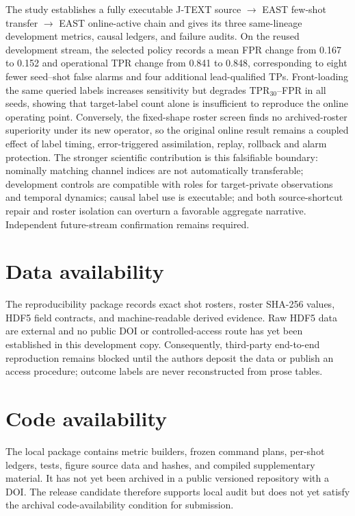 \documentclass[10pt,twocolumn]{article}
\newcommand{\jtext}{J-TEXT}
\newcommand{\east}{EAST}
\begin{document}
The study establishes a fully executable \jtext{} source $\rightarrow$ \east{} few-shot transfer $\rightarrow$ \east{} online-active chain and gives its three same-lineage development metrics, causal ledgers, and failure audits.  On the reused development stream, the selected policy records a mean FPR change from 0.167 to 0.152 and operational TPR change from 0.841 to 0.848, corresponding to eight fewer seed--shot false alarms and four additional lead-qualified TPs.  Front-loading the same queried labels increases sensitivity but degrades TPR$_{30}$--FPR in all seeds, showing that target-label count alone is insufficient to reproduce the online operating point.  Conversely, the fixed-shape roster screen finds no archived-roster superiority under its new operator, so the original online result remains a coupled effect of label timing, error-triggered assimilation, replay, rollback and alarm protection.  The stronger scientific contribution is this falsifiable boundary: nominally matching channel indices are not automatically transferable; development controls are compatible with roles for target-private observations and temporal dynamics; causal label use is executable; and both source-shortcut repair and roster isolation can overturn a favorable aggregate narrative.  Independent future-stream confirmation remains required.

\section*{Data availability}

The reproducibility package records exact shot rosters, roster SHA-256 values, HDF5 field contracts, and machine-readable derived evidence.  Raw HDF5 data are external and no public DOI or controlled-access route has yet been established in this development copy.  Consequently, third-party end-to-end reproduction remains blocked until the authors deposit the data or publish an access procedure; outcome labels are never reconstructed from prose tables.

\section*{Code availability}

The local package contains metric builders, frozen command plans, per-shot ledgers, tests, figure source data and hashes, and compiled supplementary material.  It has not yet been archived in a public versioned repository with a DOI.  The release candidate therefore supports local audit but does not yet satisfy the archival code-availability condition for submission.
\end{document}
